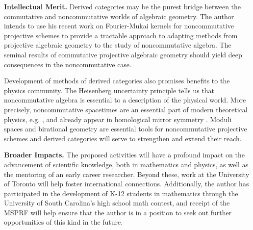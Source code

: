 \documentclass[11pt]{article}
\begin{document}



\noindent\textbf{Intellectual Merit.}
Derived categories may be the purest bridge between the commutative and noncommutative worlds of algebraic geometry.
The author intends to use his recent work on Fourier-Mukai kernels for noncommutative projective schemes to provide a tractable approach to adapting methods from projective algebraic geometry to the study of noncommutative algebra.
The seminal results of commutative projective algebraic geometry should yield deep consequences in the noncommutative case.

Development of methods of derived categories also promises benefits to the physics community.
The Heisenberg uncertainty principle tells us that noncommutative algebra is essential to a description of the physical world.
More precisely, noncommutative spacetimes are an essential part of modern theoretical physics, e.g. \cite{DoNe01}, and already appear in homological mirror symmetry \cite{AKO08}.
Moduli spaces and birational geometry are essential tools for noncommutative projective schemes and derived categories will serve to strengthen and extend their reach.

\noindent\textbf{Broader Impacts.}
The proposed activities will have a profound impact on the advancement of scientific knowledge, both in mathematics and physics, as well as the mentoring of an early career researcher.
Beyond these, work at the University of Toronto will help foster international connections.
Additionally, the author has participated in the development of K-12 students in mathematics through the University of South Carolina's high school math contest, and receipt of the MSPRF will help ensure that the author is in a position to seek out further opportunities of this kind in the future.

\end{document}
